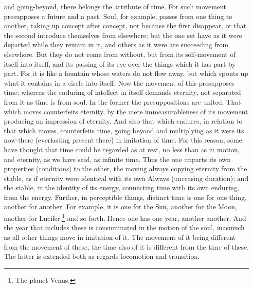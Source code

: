 \documentclass[12pt]{article}
\begin{document}
and going-beyond, there belongs the attribute of time. For such movement
presupposes a future and a past. Soul, for example, passes from one thing to
another, taking up concept after concept, not because the first disappear, or
that the second introduce themselves from elsewhere; but the one set have as it
were departed while they remain in it, and others as it were are succeeding
from elsewhere. But they do not come from without, but from its self-movement
of itself into itself, and its passing of its eye over the things which it has
part by part. For it is like a fountain whose waters do not flow away, but
which spouts up what it contains in a circle into itself. Now the movement of
this presupposes time; whereas the enduring of intellect in itself demands
eternity, not separated from it as time is from soul. In the former the
presuppositions are united. That which moves counterfeits eternity, by the mere
immeasurableness of its movement producing an impression of eternity. And also
that which endures, in relation to that which moves, counterfeits time, going
beyond and multiplying as it were its now-there (everlasting present there) in
imitation of time. For this reason, some have thought that time could be
regarded as at rest, no less than as in motion, and eternity, as we have said,
as infinite time. Thus the one imparts its own properties (conditions) to the
other, the moving always copying eternity from the stable, as if eternity were
identical with its own Always (unceasing duration); and the stable, in the
identity of its energy, connecting time with its own enduring, from the energy.
Further, in perceptible things, distinct time is one for one thing, another for
another. For example, it is one for the Sun, another for the Moon, another for
Lucifer,\footnote{The planet Venus.} and so forth. Hence one has one year,
another another. And the year that includes these is consummated in the motion
of the soul, inasmuch as all other things move in imitation of it. The movement
of it being different from the movement of these, the time also of it is
different from the time of these. The latter is extended both as regards
locomotion and transition.
\end{document}
